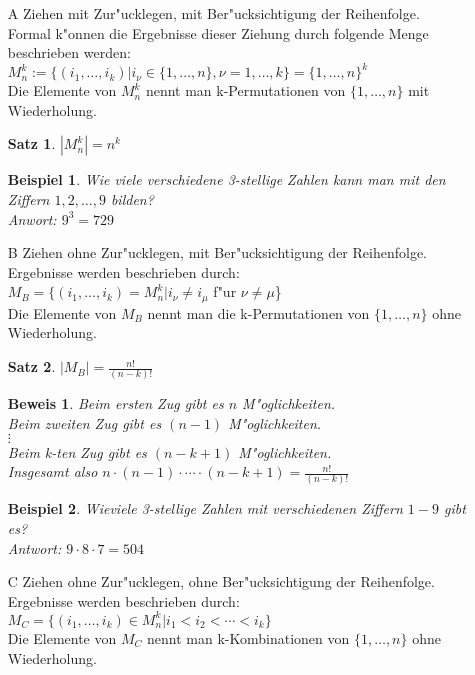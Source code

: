 \documentclass[a4paper,11pt]{book}
\newtheorem{Sa}{Satz}[chapter]
\newtheorem{Bsp}{Beispiel}[chapter]
\theoremstyle{nonumberplain}
\newtheorem{Bew}{Beweis}
\begin{document}
\begin{itemize}
	\item [A] Ziehen mit Zur"ucklegen, mit Ber"ucksichtigung der Reihenfolge. \\
Formal k"onnen die Ergebnisse dieser Ziehung durch folgende Menge beschrieben werden:\\
	$M_n^k :=\{(i_1,\ldots,i_k)|i_\nu \in \{1,\ldots,n\}, \nu=1,\ldots,k\}=\{1,\ldots,n\}^k$ \\
	Die Elemente von $M_n^k$ nennt man k-Permutationen von $\{1,\ldots,n\}$ mit Wiederholung.
	\begin{Sa}
 $|M_n^k|=n^k$ 
 \end{Sa}
 \begin{Bsp}Wie viele verschiedene 3-stellige Zahlen kann man mit den Ziffern $1,2,\ldots,9$ bilden?\\
	Anwort: $9^3=729$
	\end{Bsp}
	\item [B] Ziehen ohne Zur"ucklegen, mit Ber"ucksichtigung der Reihenfolge. \\
Ergebnisse werden beschrieben durch: \\
	$M_B=\{(i_1,\ldots,i_k)=M_n^k| i_\nu \neq i_\mu$ f"ur $\nu \neq \mu $\}\\
	Die Elemente von $M_B$ nennt man die k-Permutationen von $\{1,\ldots,n\}$ ohne Wiederholung.
	\begin{Sa} 
	$|M_B|=\frac{n!}{(n-k)!}$
	\end{Sa}
	\begin{Bew}
	Beim ersten Zug gibt es $n$ M"oglichkeiten.\\
	Beim zweiten Zug gibt es $(n-1)$ M"oglichkeiten.\\
	$\vdots$\\
	Beim k-ten Zug gibt es $(n-k+1)$ M"oglichkeiten.\\
	Insgesamt also $n\cdot(n-1)\cdot\cdots\cdot(n-k+1)=\frac{n!}{(n-k)!}$
	\end{Bew}
	\begin{Bsp}
	Wieviele 3-stellige Zahlen mit verschiedenen Ziffern $1-9$ gibt es?\\
	Antwort: $9\cdot8\cdot7=504$
	\end{Bsp}
	\item [C] Ziehen ohne Zur"ucklegen, ohne Ber"ucksichtigung der Reihenfolge.\\
 Ergebnisse werden beschrieben durch: \\
	$M_C=\{(i_1,\ldots,i_k) \in M_n^k| i_1<i_2<\cdots<i_k\}$\\
	Die Elemente von $M_C$ nennt man k-Kombinationen von $\{1,\ldots,n\}$ ohne Wiederholung.

\end{itemize}
\end{document}

